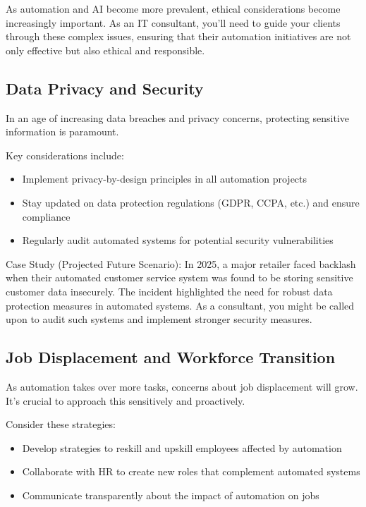 As automation and AI become more prevalent, ethical considerations become increasingly important. As an IT consultant, you'll need to guide your clients through these complex issues, ensuring that their automation initiatives are not only effective but also ethical and responsible.

\subsection{Data Privacy and Security}

In an age of increasing data breaches and privacy concerns, protecting sensitive information is paramount.

Key considerations include:

\begin{itemize}
    \item Implement privacy-by-design principles in all automation projects
    \item Stay updated on data protection regulations (GDPR, CCPA, etc.) and ensure compliance
    \item Regularly audit automated systems for potential security vulnerabilities
\end{itemize}

Case Study (Projected Future Scenario): In 2025, a major retailer faced backlash when their automated customer service system was found to be storing sensitive customer data insecurely. The incident highlighted the need for robust data protection measures in automated systems. As a consultant, you might be called upon to audit such systems and implement stronger security measures.

\subsection{Job Displacement and Workforce Transition}

As automation takes over more tasks, concerns about job displacement will grow. It's crucial to approach this sensitively and proactively.

Consider these strategies:

\begin{itemize}
    \item Develop strategies to reskill and upskill employees affected by automation
    \item Collaborate with HR to create new roles that complement automated systems
    \item Communicate transparently about the impact of automation on jobs
\end{itemize}

